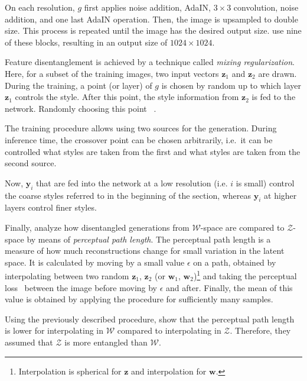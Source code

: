 On each resolution, $g$ first applies noise addition, \ac{AdaIN}, $3\times 3$ convolution, noise addition, and one last \ac{AdaIN} operation.
Then, the image is upsampled to double size.
This process is repeated until the image has the desired output size.
\citet{karras2019style} use nine of these blocks, resulting in an output size of $1024\times 1024$.

Feature disentanglement is achieved by a technique called \textit{mixing regularization}.
Here, for a subset of the training images, two input vectors $\bm{z}_1$ and $\bm{z}_2$ are drawn.
During the training, a point (or layer) of $g$ is chosen by random up to which layer $\bm{z}_1$ controls the style.
After this point, the style information from $\bm{z}_2$ is fed to the network.
Randomly choosing this point ~\citep{karras2019style}.

The training procedure allows using two sources for the generation.
During inference time, the crossover point can be chosen arbitrarily, i.e.~it can be controlled what styles are taken from the first and what styles are taken from the second source.

Now, $\bm{y}_i$ that are fed into the network at a low resolution (i.e. $i$ is small) control the coarse styles referred to in the beginning of the section, whereas $\bm{y}_i$ at higher layers control finer styles.

Finally, \citet{karras2019style} analyze how disentangled generations from $\mathcal{W}$-space are compared to $\mathcal{Z}$-space by means of \textit{perceptual path length}.
The perceptual path length is a measure of how much reconstructions change for small variation in the latent space.
It is calculated by moving by a small value $\epsilon$ on a path, obtained by interpolating between two random $\bm{z}_1$, $\bm{z}_2$ (or $\bm{w}_1$, $\bm{w}_2$)\footnote{Interpolation is spherical for $\bm{z}$ and interpolation for $\bm{w}$.} and taking the perceptual loss~\citep{johnson2016perceptual} between the image before moving by $\epsilon$ and after.
Finally, the mean of this value is obtained by applying the procedure for sufficiently many samples.

Using the previously described procedure, \citet{karras2019style} show that the perceptual path length is lower for interpolating in $\mathcal{W}$ compared to interpolating in $\mathcal{Z}$.
Therefore, they assumed that $\mathcal{Z}$ is more entangled than $\mathcal{W}$.

